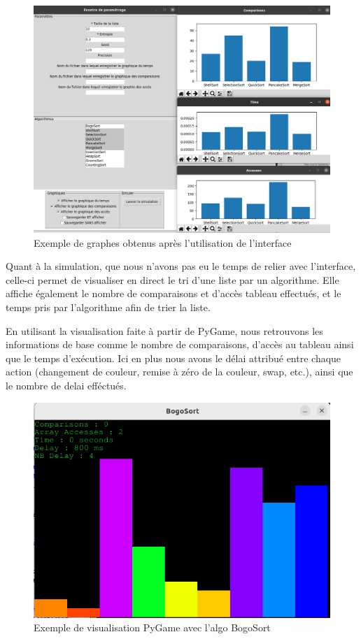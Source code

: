 \documentclass[10pt,a4paper]{article}
\begin{document}
        \begin{figure}[h]
            \caption{\scriptsize Exemple de graphes obtenus après l'utilisation de l'interface}
            \centering
            \includegraphics[scale=0.2]{img/interface.png}
        \end{figure}

        Quant à la simulation, que nous n'avons pas eu le temps de relier avec l'interface, celle-ci permet de visualiser en direct le tri d'une liste par un algorithme. Elle affiche également le nombre de comparaisons et d'accès tableau effectués, et le temps pris par l'algorithme afin de trier la liste.
                        
        En utilisant la visualisation faite à partir de PyGame, nous retrouvons les informations de base comme le nombre de comparaisons, d'accès au tableau ainsi que le temps d'exécution. Ici en plus nous avons le délai attribué entre chaque action (changement de couleur, remise à zéro de la couleur, swap, etc.), ainsi que le nombre de delai efféctués.
        
        \begin{figure}
            \caption{\scriptsize Exemple de visualisation PyGame avec l'algo BogoSort}
            \centering
            \includegraphics[scale=0.4]{img/pgVisual.png}
        \end{figure}
        
\end{document}
